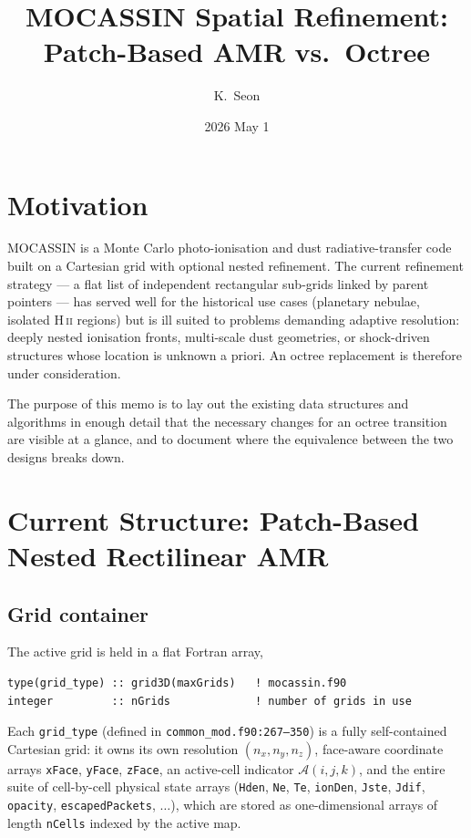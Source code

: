 \documentclass[11pt,a4paper]{my_memo}
\title{MOCASSIN Spatial Refinement: Patch-Based AMR vs.\ Octree}
\author{K.\ Seon}
\date{2026 May 1}
\begin{document}
\maketitle

\section{Motivation}

MOCASSIN is a Monte Carlo photo-ionisation and dust radiative-transfer code
built on a Cartesian grid with optional nested refinement.  The current
refinement strategy --- a flat list of independent rectangular sub-grids
linked by parent pointers --- has served well for the historical use cases
(planetary nebulae, isolated H\,\textsc{ii} regions) but is ill suited to
problems demanding adaptive resolution: deeply nested ionisation fronts,
multi-scale dust geometries, or shock-driven structures whose location is
unknown a priori.  An octree replacement is therefore under consideration.

The purpose of this memo is to lay out the existing data structures and
algorithms in enough detail that the necessary changes for an octree
transition are visible at a glance, and to document where the equivalence
between the two designs breaks down.

\section{Current Structure: Patch-Based Nested Rectilinear AMR}

\subsection{Grid container}

The active grid is held in a flat Fortran array,
\begin{lstlisting}
type(grid_type) :: grid3D(maxGrids)   ! mocassin.f90
integer         :: nGrids             ! number of grids in use
\end{lstlisting}
\begin{sloppypar}
Each \texttt{grid\_type} (defined in \texttt{common\_mod.f90:267--350}) is a
fully self-contained Cartesian grid: it owns its own resolution
$(n_x, n_y, n_z)$, face-aware coordinate arrays
\texttt{xFace}, \texttt{yFace}, \texttt{zFace}, an active-cell indicator
$\mathcal{A}(i,j,k)$, and the entire suite of cell-by-cell physical state arrays
(\texttt{Hden}, \texttt{Ne}, \texttt{Te}, \texttt{ionDen}, \texttt{Jste},
\texttt{Jdif}, \texttt{opacity}, \texttt{escapedPackets}, $\ldots$),
which are stored as one-dimensional arrays of length \texttt{nCells} indexed
by the active map.
\end{sloppypar}
\end{document}
